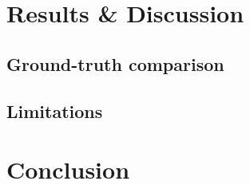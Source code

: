 \documentclass{thesisclass}
\newcommand*\circled[1]{\tikz[baseline=(char.base)]{
		\node[shape=circle,draw,inner sep=2pt, fill=black] (char) {\textcolor{white}{#1}};}}
\begin{document}
%
%		
%
%
%
%
%

\chapter{Results \& Discussion}
\label{ch:results}

\section{Ground-truth comparison}

\section{Limitations}

\chapter{Conclusion}
\label{ch:conclusion}



\end{document}
